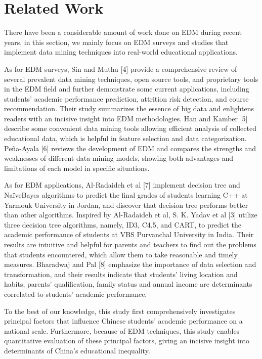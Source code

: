 \documentclass[conference]{IEEEtran}
\begin{document}
\section{Related Work}

There have been a considerable amount of work done on EDM during recent years, in this section, we mainly focus on EDM surveys and studies that implement data mining techniques into real-world educational applications.

As for EDM surveys, Sin and Muthu [4] provide a comprehensive review of several prevalent data mining techniques, open source tools, and proprietary tools in the EDM field and further demonstrate some current applications, including students' academic performance prediction, attrition risk detection, and course recommendation. Their study summarizes the essence of big data and enlightens readers with an incisive insight into EDM methodologies. Han and Kamber [5] describe some convenient data mining tools allowing efficient analysis of collected educational data, which is helpful in feature selection and data categorization. Peña-Ayala [6] reviews the development of EDM and compares the strengths and weaknesses of different data mining models, showing both advantages and limitations of each model in specific situations.

As for EDM applications, Al-Radaideh et al [7] implement decision tree and NaïveBayes algorithms to predict the final grades of students learning C++ at Yarmouk University in Jordan, and discover that decision tree performs better than other algorithms. Inspired by Al-Radaideh et al, S. K. Yadav et al [3] utilize three decision tree algorithms, namely, ID3, C4.5, and CART, to predict the academic performance of students at VBS Purvanchal University in India. Their results are intuitive and helpful for parents and teachers to find out the problems that students encountered, which allow them to take reasonable and timely measures. Bharadwaj and Pal [8] emphasize the importance of data selection and transformation, and their results indicate that students' living location and habits, parents' qualification, family status and annual income are determinants correlated to students' academic performance. 

To the best of our knowledge, this study first comprehensively investigates principal factors that influence Chinese students' academic performance on a national scale. Furthermore, because of EDM techniques, this study enables quantitative evaluation of these principal factors, giving an incisive insight into determinants of China's educational inequality.
\end{document}
